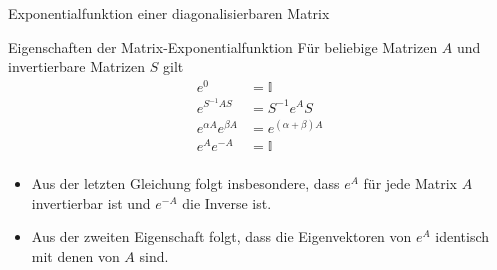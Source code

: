 \documentclass[notheorems,hidelinks,aspectratio=1610]{beamer}
\begin{document}
\begin{frame}{Exponentialfunktion einer diagonalisierbaren Matrix}
  
\end{frame}

\begin{frame}{Eigenschaften der Matrix-Exponentialfunktion}
  Für beliebige Matrizen $A$ und invertierbare Matrizen $S$ gilt
  \begin{align*}
    e^0 &= \mathbb I\\
    e^{S^{-1}AS} &= S^{-1} e^A S\\
    e^{\alpha A} e^{\beta A} &= e^{(\alpha+\beta) A}\\
    e^{A}e^{-A} &= \mathbb I\\
  \end{align*}
  \begin{itemize}
  \item Aus der letzten Gleichung folgt insbesondere, dass $e^A$ für jede
    Matrix $A$ invertierbar ist und $e^{-A}$ die Inverse ist.
  \item Aus der zweiten Eigenschaft folgt, dass die Eigenvektoren von
    $e^A$ identisch mit denen von $A$ sind.
  \end{itemize}
\end{frame}
\end{document}
